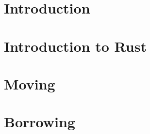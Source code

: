 \documentclass{report}
\begin{document}

%

\tableofcontents

\chapter*{Introduction}


\chapter{Introduction to Rust}


\chapter{Moving}


\chapter{Borrowing}


%

%

%

%

%



\end{document}
